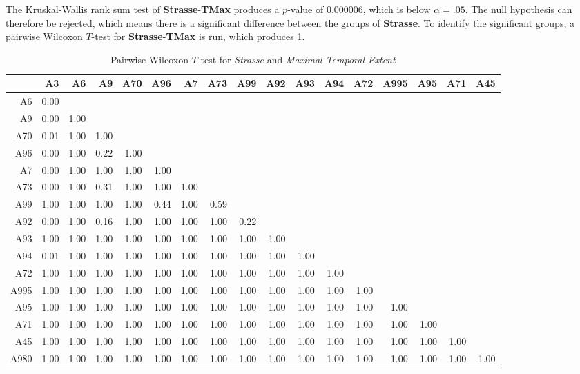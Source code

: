 The Kruskal-Wallis rank sum test of \textbf{Strasse}-\textbf{TMax} produces a $p$-value of 0.000006, which is below $\alpha=.05$. The null hypothesis can therefore be rejected, which means there is a significant difference between the groups of \textbf{Strasse}. To identify the significant groups, a pairwise Wilcoxon $T$-test for \textbf{Strasse}-\textbf{TMax} is run, which produces \cref{tbl:wilcoxon_baysis_matched_Strasse_TMax}. 
\begin{table}[ht]
	\tiny
	\setlength{\tabcolsep}{4pt}
	\centering
	\begin{tabular}{rrrrrrrrrrrrrrrrr}
		\toprule
				& A3 & A6 & A9 & A70 & A96 & A7 & A73 & A99 & A92 & A93 & A94 & A72 & A995 & A95 & A71 & A45 \\ 
		\midrule
		A6 		& 0.00 &  &  &  &  &  &  &  &  &  &  &  &  &  &  &  \\ 
		A9 		& 0.00 & 1.00 &  &  &  &  &  &  &  &  &  &  &  &  &  &  \\ 
		A70 	& 0.01 & 1.00 & 1.00 &  &  &  &  &  &  &  &  &  &  &  &  &  \\ 
		A96 	& 0.00 & 1.00 & 0.22 & 1.00 &  &  &  &  &  &  &  &  &  &  &  &  \\ 
		A7 		& 0.00 & 1.00 & 1.00 & 1.00 & 1.00 &  &  &  &  &  &  &  &  &  &  &  \\ 
		A73 	& 0.00 & 1.00 & 0.31 & 1.00 & 1.00 & 1.00 &  &  &  &  &  &  &  &  &  &  \\ 
		A99 	& 1.00 & 1.00 & 1.00 & 1.00 & 0.44 & 1.00 & 0.59 &  &  &  &  &  &  &  &  &  \\ 
		A92 	& 0.00 & 1.00 & 0.16 & 1.00 & 1.00 & 1.00 & 1.00 & 0.22 &  &  &  &  &  &  &  &  \\ 
		A93 	& 1.00 & 1.00 & 1.00 & 1.00 & 1.00 & 1.00 & 1.00 & 1.00 & 1.00 &  &  &  &  &  &  &  \\ 
		A94 	& 0.01 & 1.00 & 1.00 & 1.00 & 1.00 & 1.00 & 1.00 & 1.00 & 1.00 & 1.00 &  &  &  &  &  &  \\ 
		A72 	& 1.00 & 1.00 & 1.00 & 1.00 & 1.00 & 1.00 & 1.00 & 1.00 & 1.00 & 1.00 & 1.00 &  &  &  &  &  \\ 
		A995 	& 1.00 & 1.00 & 1.00 & 1.00 & 1.00 & 1.00 & 1.00 & 1.00 & 1.00 & 1.00 & 1.00 & 1.00 &  &  &  &  \\ 
		A95 	& 1.00 & 1.00 & 1.00 & 1.00 & 1.00 & 1.00 & 1.00 & 1.00 & 1.00 & 1.00 & 1.00 & 1.00 & 1.00 &  &  &  \\ 
		A71 	& 1.00 & 1.00 & 1.00 & 1.00 & 1.00 & 1.00 & 1.00 & 1.00 & 1.00 & 1.00 & 1.00 & 1.00 & 1.00 & 1.00 &  &  \\ 
		A45 	& 1.00 & 1.00 & 1.00 & 1.00 & 1.00 & 1.00 & 1.00 & 1.00 & 1.00 & 1.00 & 1.00 & 1.00 & 1.00 & 1.00 & 1.00 &  \\ 
		A980 	& 1.00 & 1.00 & 1.00 & 1.00 & 1.00 & 1.00 & 1.00 & 1.00 & 1.00 & 1.00 & 1.00 & 1.00 & 1.00 & 1.00 & 1.00 & 1.00 \\ 
		\bottomrule
	\end{tabular}
	\caption{Pairwise Wilcoxon $T$-test for \textit{Strasse} and \textit{Maximal Temporal Extent}}
	\label{tbl:wilcoxon_baysis_matched_Strasse_TMax}
\end{table}
